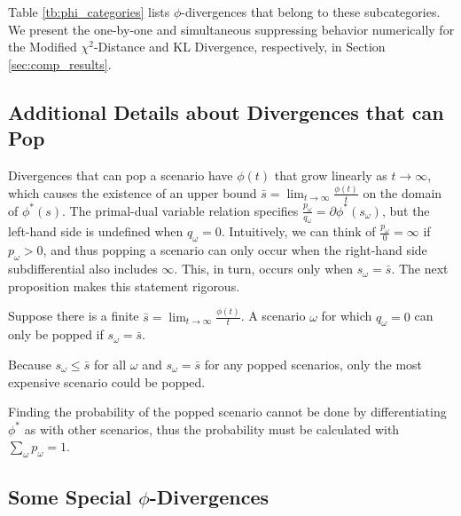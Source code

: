 \documentclass[ijoc,letterpaper]{informs3} %
\begin{document}
Table \ref{tb:phi_categories} lists $\phi$-divergences that belong to these subcategories. We present the one-by-one and simultaneous suppressing behavior numerically for the Modified $\chi^2$-Distance and KL Divergence, respectively, in Section \ref{sec:comp_results}.

\subsection{Additional Details about Divergences that can Pop}
\label{ssec:pop}

Divergences that can pop a scenario have $\phi(t)$ that grow linearly as $t \rightarrow \infty$, which causes the existence of an upper bound $\bar{s} = \lim_{t \rightarrow \infty} \frac{\phi(t)}{t}$ on the domain of $\phi^*(s)$.
The primal-dual variable relation specifies $\frac{p_\omega}{q_\omega} = \partial \phi^*(s_\omega)$, but the left-hand side is undefined when $q_\omega = 0$.
Intuitively, we can think of $\frac{p_\omega}{0} = \infty$ if $p_\omega > 0$, and thus popping a scenario can only occur when the right-hand side subdifferential also includes $\infty$.
This, in turn, occurs only when $s_\omega = \bar{s}$.
The next proposition makes this statement rigorous.

\begin{proposition} \label{prop:pop}
	Suppose there is a finite $\bar{s} = \lim_{t \rightarrow \infty} \frac{\phi(t)}{t}$.
	A scenario $\omega$ for which $q_\omega = 0$ can only be popped if $s_\omega = \bar{s}$.
\end{proposition}

\begin{remark}
	Because $s_\omega \leq \bar{s}$ for all $\omega$ and $s_\omega = \bar{s}$ for any popped scenarios, only the most expensive scenario could be popped.
\end{remark}

\begin{remark}
	Finding the probability of the popped scenario cannot be done by differentiating $\phi^*$ as with other scenarios, thus the probability must be calculated with $\sum_\omega p_\omega = 1$.
\end{remark}

\subsection{Some Special $\phi$-Divergences}
\label{ssec:special_phi}
\end{document}
